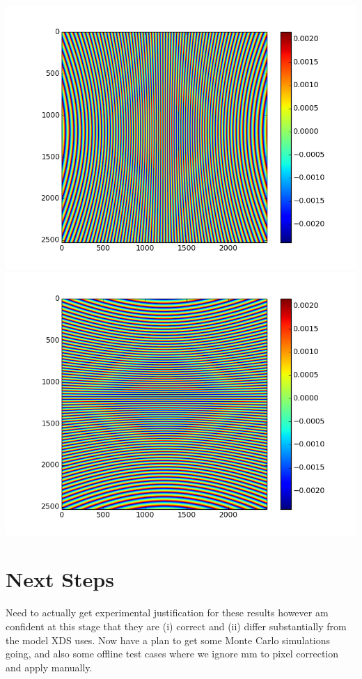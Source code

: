 \documentclass{article}
\begin{document}
{
\centering
\includegraphics[scale=0.3]{dx.png}
\includegraphics[scale=0.3]{dy.png}
}


\section{Next Steps}

Need to actually get experimental justification for these results
however am confident at this stage that they are (i) correct and (ii)
differ substantially from the model XDS uses. Now have a plan to get
some Monte Carlo simulations going, and also some offline test cases
where we ignore mm to pixel correction and apply manually.
\end{document}
